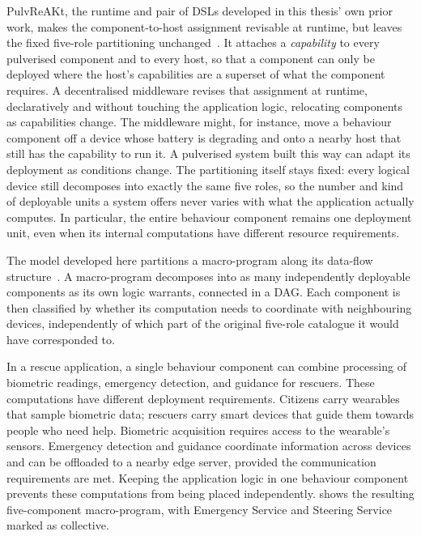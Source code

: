 PulvReAKt, the runtime and pair of \acp{DSL} developed in this thesis' own prior work,
makes the component-to-host assignment revisable at runtime,
but leaves the fixed five-role partitioning unchanged~\cite{DBLP:journals/fgcs/FarabegoliPCV24}.
%
It attaches a \emph{capability} to every pulverised component and to every host,
so that a component can only be deployed where the host's capabilities are a superset of what the component requires.
%
A decentralised middleware revises that assignment at runtime,
declaratively and without touching the application logic,
relocating components as capabilities change.
%
The middleware might, for instance, move a behaviour component off a device whose battery is degrading and onto a nearby host that still has the capability to run it.
%
A pulverised system built this way can adapt its deployment as conditions change.
%
The partitioning itself stays fixed:
every logical device still decomposes into exactly the same five roles,
so the number and kind of deployable units a system offers never varies with what the application actually computes.
In particular, the entire behaviour component remains one deployment unit,
even when its internal computations have different resource requirements.

The model developed here partitions a macro-program along its data-flow structure~\cite{DBLP:conf/acsos/FarabegoliVC24}.
%
A macro-program decomposes into as many independently deployable components as its own logic warrants,
connected in a \ac{DAG}.
%
Each component is then classified by whether its computation needs to coordinate with neighbouring devices,
independently of which part of the original five-role catalogue it would have corresponded to.

In a rescue application, a single behaviour component can combine processing of biometric readings, emergency detection, and guidance for rescuers.
These computations have different deployment requirements.
Citizens carry wearables that sample biometric data;
rescuers carry smart devices that guide them towards people who need help.
Biometric acquisition requires access to the wearable's sensors.
Emergency detection and guidance coordinate information across devices and can be offloaded to a nearby edge server, provided the communication requirements are met.
Keeping the application logic in one behaviour component prevents these computations from being placed independently.
%
 shows the resulting five-component macro-program, with Emergency Service and Steering Service marked as collective.

